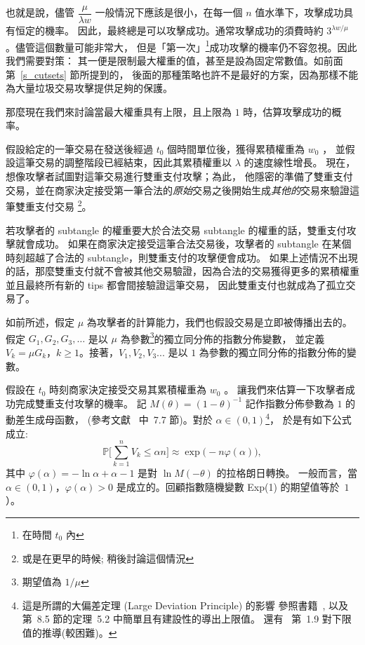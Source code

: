 \documentclass[12pt]{article}
\newcommand{\IP}{\mathbb{P}}
\let\phi=\varphi
\begin{document}
\begin{CJK}{UTF8}{bkai}
也就是說，儘管 $\dfrac{\mu}{\lambda w}$ 一般情況下應該是很小，在每一個 $n$ 值水準下，攻擊成功具有恒定的機率。
因此，最終總是可以攻擊成功。通常攻擊成功的須費時約 $3^{\lambda w/\mu}$ 。儘管這個數量可能非常大，
但是「第一次」\footnote{在時間 $t_0$ 內}成功攻擊的機率仍不容忽視。因此我們需要對策：
其一便是限制最大權重的值，甚至是設為固定常數值。如前面第~\ref{s_cutsets} 節所提到的，
後面的那種策略也許不是最好的方案，因為那樣不能為大量垃圾交易攻擊提供足夠的保護。


\medskip

那麼現在我們來討論當最大權重具有上限，且上限為 $1$ 時，估算攻擊成功的概率。 

假設給定的一筆交易在發送後經過 $t_0$ 個時間單位後，獲得累積權重為 $w_0$ ，
並假設這筆交易的調整階段已經結束，因此其累積權重以 $\lambda$ 的速度線性增長。
現在，想像攻擊者試圖對這筆交易進行雙重支付攻擊；為此，
他隱密的準備了雙重支付交易，並在商家決定接受第一筆合法的\emph{原始}交易之後開始生成\emph{其他的}交易來驗證這筆雙重支付交易
\footnote{或是在更早的時候; 稍後討論這個情況}。

若攻擊者的 subtangle 的權重要大於合法交易 subtangle 的權重的話，雙重支付攻擊就會成功。
如果在商家決定接受這筆合法交易後，攻擊者的 subtangle 在某個時刻超越了合法的 subtangle，則雙重支付的攻擊便會成功。
如果上述情況不出現的話，那麼雙重支付就不會被其他交易驗證，因為合法的交易獲得更多的累積權重並且最終所有新的 tips 都會間接驗證這筆交易，
因此雙重支付也就成為了孤立交易了。

如前所述，假定 $\mu$ 為攻擊者的計算能力，我們也假設交易是立即被傳播出去的。
假定 $G_1,G_2, G_3,\ldots$ 是以 $\mu$ 為參數\footnote{期望值為 $1/\mu$}的獨立同分佈的指數分佈變數，
並定義 $V_k=\mu G_k$，$k\geq1$。接著，$V_1, V_2,V_3...$ 是以 $1$ 為參數的獨立同分佈的指數分佈的變數。

假設在 $t_0$ 時刻商家決定接受交易其累積權重為 $w_0$ 。
讓我們來估算一下攻擊者成功完成雙重支付攻擊的機率。
記 $M(\theta)=(1-\theta)^{-1}$ 記作指數分佈參數為 $1$ 的動差生成母函數，
(參考文獻~\cite{Ross} 中~7.7 節)。對於 $\alpha\in(0,1)$\footnote{這是所謂的大偏差定理 (Large Deviation Principle) 的影響
參照書籍~\cite{DZ}, 以及~\cite{Ross} 第~8.5 節的定理~5.2 中簡單且有建設性的導出上限值。
還有~\cite{Dur} 第~1.9 對下限值的推導(較困難)。}，
於是有如下公式成立:
\begin{equation}
\label{Chernoff}
 \IP\Big[\sum_{k=1}^n V_k \leq \alpha n\Big] \approx
   \exp\big(-n\phi(\alpha)\big), 
\end{equation}
其中 $\phi(\alpha)=-\ln \alpha + \alpha -1$ 是對 $\ln M(-\theta)$ 的拉格朗日轉換。
一般而言，當 $\alpha\in(0,1)$，$\varphi(\alpha)>0$ 是成立的。回顧指數隨機變數 Exp(1) 的期望值等於~$1$）。


\end{CJK}
\end{document}
